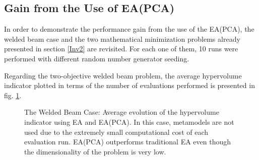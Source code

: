 
\subsection{Gain from the Use of EA(PCA)}

In order to demonstrate the performance gain from the use of the EA(PCA), the welded beam case and the two mathematical minimization problems already presented in section \ref{Inv2} are revisited. For each one of them, 10 runs were performed with different random number generator seeding. 

Regarding the two-objective welded beam problem, the average hypervolume indicator plotted in terms of the number of evaluations performed is presented in fig. \ref{HypervolumeComparison}. 

\begin{figure}[h!]
\begin{minipage}[b]{1\linewidth}
 \centering
\end{minipage}
\caption{The Welded Beam Case: Average evolution of the hypervolume indicator using EA and EA(PCA). In this case, metamodels are not used due to the extremely small computational cost of each evaluation run. EA(PCA) outperforms traditional EA even though the dimensionality of the problem is very low.} 
\label{HypervolumeComparison}
\end{figure}


